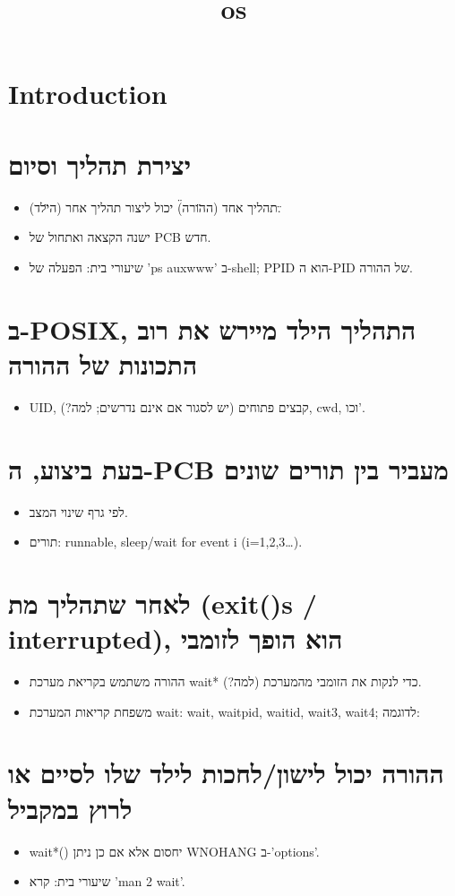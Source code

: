 \documentclass[12pt]{report}
\title{os}
\author{}
\begin{document}
\maketitle
\tableofcontents
\newpage

\section{Introduction}
  \section{יצירת תהליך וסיום}  \begin{itemize}  \item תהליך אחד (ה\"הורה\") יכול ליצור תהליך אחר (ה\"ילד\").  \item ישנה הקצאה ואתחול של PCB חדש.  \item שיעורי בית: הפעלה של 'ps auxwww' ב-shell; PPID הוא ה-PID של ההורה.  \end{itemize}    \section{ב-POSIX, התהליך הילד מיירש את רוב התכונות של ההורה}  \begin{itemize}  \item UID, קבצים פתוחים (יש לסגור אם אינם נדרשים; למה?), cwd, וכו'.  \end{itemize}    \section{בעת ביצוע, ה-PCB מעביר בין תורים שונים}  \begin{itemize}  \item לפי גרף שינוי המצב.  \item תורים: runnable, sleep/wait for event i (i=1,2,3…).  \end{itemize}    \section{לאחר שתהליך מת (exit()s / interrupted), הוא הופך לזומבי}  \begin{itemize}  \item ההורה משתמש בקריאת מערכת wait* כדי לנקות את הזומבי מהמערכת (למה?).  \item משפחת קריאות המערכת wait: wait, waitpid, waitid, wait3, wait4; לדוגמה:  \end{itemize}    \section{ההורה יכול לישון/לחכות לילד שלו לסיים או לרוץ במקביל}  \begin{itemize}  \item wait*() יחסום אלא אם כן ניתן WNOHANG ב-'options'.  \item שיעורי בית: קרא 'man 2 wait'.  \end{itemize}  
\end{document}
